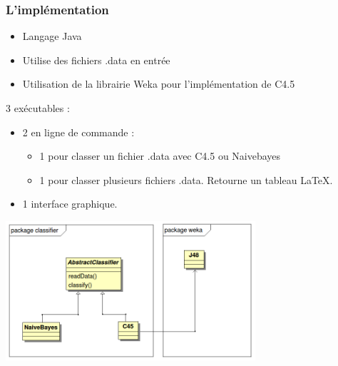 \begin{frame}
 \frametitle{L'implémentation}

\begin{itemize}
 \item Langage Java
 \item Utilise des fichiers .data en entrée
 \item Utilisation de la librairie Weka pour l'implémentation de C4.5
\end{itemize}
3 exécutables : 
\begin{itemize}
 \item 2 en ligne de commande : 
    \begin{itemize}
      \item 1 pour classer un fichier .data avec C4.5 ou Naivebayes
      \item 1 pour classer plusieurs fichiers .data. Retourne un tableau LaTeX.
    \end{itemize}
  \item 1 interface graphique.
\end{itemize}

\end{frame}

 \begin{frame}%
 \begin{center}

\includegraphics[width=350px]{classDiagram.png}
\end{center}



\end{frame}
 